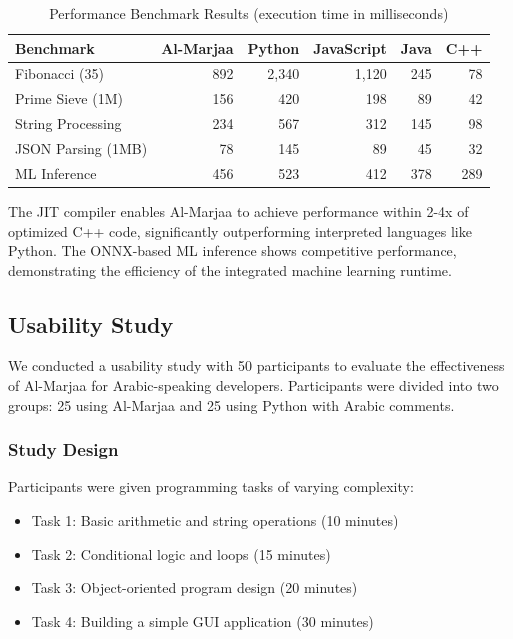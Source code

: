 \documentclass[11pt,a4paper]{article}
\begin{document}
\begin{table}[h]
\centering
\caption{Performance Benchmark Results (execution time in milliseconds)}
\label{tab:performance}
\begin{tabular}{@{}lrrrrr@{}}
\toprule
\textbf{Benchmark} & \textbf{Al-Marjaa} & \textbf{Python} & \textbf{JavaScript} & \textbf{Java} & \textbf{C++} \\
\midrule
Fibonacci (35) & 892 & 2,340 & 1,120 & 245 & 78 \\
Prime Sieve (1M) & 156 & 420 & 198 & 89 & 42 \\
String Processing & 234 & 567 & 312 & 145 & 98 \\
JSON Parsing (1MB) & 78 & 145 & 89 & 45 & 32 \\
ML Inference & 456 & 523 & 412 & 378 & 289 \\
\bottomrule
\end{tabular}
\end{table}

The JIT compiler enables Al-Marjaa to achieve performance within 2-4x of optimized C++ code, significantly outperforming interpreted languages like Python. The ONNX-based ML inference shows competitive performance, demonstrating the efficiency of the integrated machine learning runtime.

\subsection{Usability Study}

We conducted a usability study with 50 participants to evaluate the effectiveness of Al-Marjaa for Arabic-speaking developers. Participants were divided into two groups: 25 using Al-Marjaa and 25 using Python with Arabic comments.

\subsubsection{Study Design}

Participants were given programming tasks of varying complexity:
\begin{itemize}
    \item Task 1: Basic arithmetic and string operations (10 minutes)
    \item Task 2: Conditional logic and loops (15 minutes)
    \item Task 3: Object-oriented program design (20 minutes)
    \item Task 4: Building a simple GUI application (30 minutes)
\end{itemize}
\end{document}
